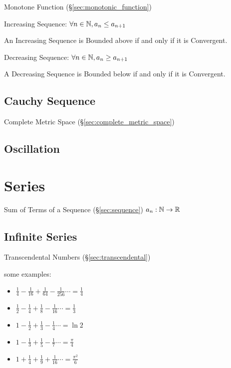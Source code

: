 Monotone Function (\S\ref{sec:monotonic_function})

Increasing Sequence: $\forall n \in \mathbb{N}, a_n \leq a_{n+1}$

An Increasing Sequence is Bounded above if and only if it is
Convergent.

Decreasing Sequence: $\forall n \in \mathbb{N}, a_n \geq a_{n+1}$

A Decreasing Sequence is Bounded below if and only if it is
Convergent.



\subsection{Cauchy Sequence}\label{sec:cauchy_sequence}

Complete Metric Space (\S\ref{sec:complete_metric_space})



\subsection{Oscillation}\label{sec:oscillation}



\section{Series}\label{sec:series}

Sum of Terms of a Sequence (\S\ref{sec:sequence}) $a_n : \mathbb{N}
\rightarrow \mathbb{R}$



\subsection{Infinite Series}\label{sec:infinite_series}

Transcendental Numbers (\S\ref{sec:transcendental})

some examples:
\begin{itemize}
  \item $\frac{1}{4} - \frac{1}{16} + \frac{1}{64} - \frac{1}{256} \cdots
    = \frac{1}{4}$
  \item $\frac{1}{2} - \frac{1}{4} + \frac{1}{8} - \frac{1}{16} \cdots
    = \frac{1}{3}$
  \item $1 - \frac{1}{2} + \frac{1}{3} - \frac{1}{4} \cdots  = \ln{2}$
  \item $1 - \frac{1}{3} + \frac{1}{5} - \frac{1}{7} \cdots  = \frac{\pi}{4}$
  \item $1 + \frac{1}{4} + \frac{1}{9} + \frac{1}{16} \cdots = \frac{\pi^2}{6}$
\end{itemize}



